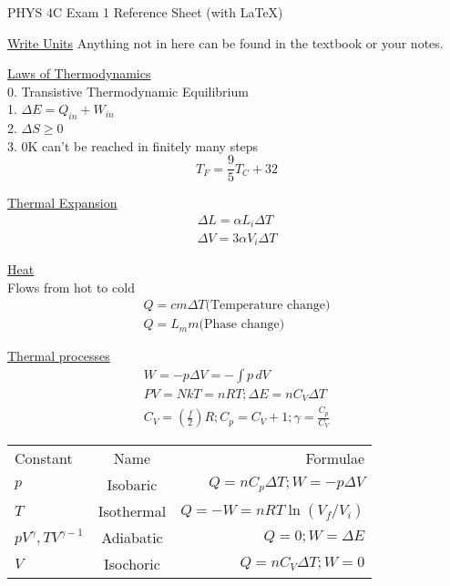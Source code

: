\documentclass[8pt]{minimal}
\begin{document}
    \setlength{\parindent}{0pt}
    \setlength{\columnsep}{1cm}
    \twocolumn
    PHYS 4C Exam 1 Reference Sheet (with \LaTeX)

    \underline{Write Units}
    Anything not in here can be found in the textbook or your notes.

    \underline{Laws of Thermodynamics}\\
    0. Transistive Thermodynamic Equilibrium\\
    1. $\Delta E = Q_{in} + W_{in}$\\
    2. $\Delta S \geq 0$\\
    3. 0K can't be reached in finitely many steps
    \begin{equation*}
        T_F =   \frac{9}{5}T_C + 32
    \end{equation*}

    \underline{Thermal Expansion}
    \begin{gather*}
        \Delta L    =   \alpha L_i \Delta T\\
        \Delta V    =   3\alpha V_i \Delta T
    \end{gather*}

    \underline{Heat}\\
    Flows from hot to cold
    \begin{gather*}
        Q   =   cm\Delta T \text{(Temperature change)}\\
        Q   =   L_m m \text{(Phase change)}
    \end{gather*}

    \underline{Thermal processes}
    \begin{gather*}
        W   =   -p\Delta V  =   -\int p\,dV\\
        PV  =   NkT =   nRT; 
        \Delta E    =   nC_V \Delta T\\
        C_V =   \left( \frac{f}{2} \right)R; C_p = C_V + 1; \gamma = \frac{C_p}{C_V}
    \end{gather*}
    \begin{center}
        \begin{tabular}{l | c | r}
            Constant    &   Name    &   Formulae\\
            $p$ &   Isobaric    &   $Q = nC_p \Delta T; W = -p\Delta V$\\
            $T$ &   Isothermal  &   $Q = -W = nRT\ln(V_f / V_i)$\\
            $pV^\gamma , TV^{\gamma - 1}$   &   Adiabatic   &   $Q = 0; W = \Delta E$\\
            $V$ &   Isochoric   &   $Q = nC_V \Delta T; W = 0$
        \end{tabular}
    \end{center}
\end{document}
